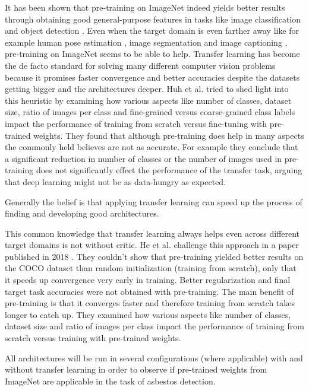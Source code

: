 It has been shown that pre-training on ImageNet indeed yields better results through obtaining good general-purpose features in tasks like image classification \cite{sharif2014cnn} and object detection \cite{girshick2014rich, sermanet2013overfeat}. Even when the target domain is even farther away like for example human pose estimation \cite{carreira2016human}, image segmentation \cite{dai2016instance} and image captioning \cite{donahue2015long, karpathy2015deep}, pre-training on ImageNet seems to be able to help. Transfer learning has become the de facto standard for solving many different computer vision problems because it promises faster convergence and better accuracies despite the datasets getting bigger and the architectures deeper. Huh et al. \cite{huh2016makes} tried to shed light into this heuristic by examining how various aspects like number of classes, dataset size, ratio of  images per class and fine-grained versus coarse-grained class labels impact the performance of training from scratch versus fine-tuning with pre-trained weights. They found that although pre-training does help in many aspects the commonly held believes are not as accurate. For example they conclude that a significant reduction in number of classes or the number of images used in pre-training does not significantly effect the performance of the transfer task, arguing that deep learning might not be as data-hungry as expected.

Generally the belief is that applying transfer learning can speed up the process of finding and developing good architectures.

This common knowledge that transfer learning always helps even across different target domains is not without critic. He et al. challenge this approach in a paper published in 2018 \cite{he2018rethinking}. They couldn't show that pre-training yielded better results on the COCO dataset than random initialization (training from scratch), only that it speeds up convergence very early in training. Better regularization and final target task accuracies were not obtained with pre-training. The main benefit of pre-training is that it converges faster and therefore training from scratch takes longer to catch up. They examined how various aspects like number of classes, dataset size and ratio of images per class impact the performance of training from scratch versus training with pre-trained weights.

All architectures will be run in several configurations (where applicable) with and without transfer learning in order to observe if pre-trained weights from ImageNet are applicable in the task of asbestos detection.

